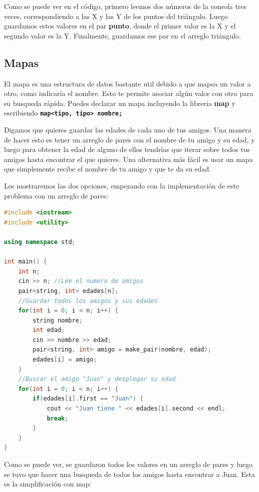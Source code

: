 \documentclass{article}
\begin{document}
Como se puede ver en el código, primero leemos dos números de la consola tres veces, correspondiendo a las X y las Y de los puntos del triángulo. Luego guardamos estos valores en el par \textbf{punto}, donde el primer valor es la X y el segundo valor es la Y. Finalmente, guardamos ese par en el arreglo triángulo.

\subsection{Mapas}

El mapa es una estructura de datos bastante util debido a que mapea un valor a otro, como indicaría el nombre. Esto te permite asociar algún valor con otro para su busqueda rápida. Puedes declarar un mapa incluyendo la libreria \textbf{map} y escribiendo \textbf{\lstinline{map<tipo, tipo> nombre;}}

Digamos que quieres guardar las edades de cada uno de tus amigos. Una manera de hacer esto es tener un arreglo de pares con el nombre de tu amigo y su edad, y luego para obtener la edad de alguno de ellos tendrías que iterar sobre todos tus amigos hasta encontrar el que quieres. Una alternativa más fácil es usar un mapa que simplemente recibe el nombre de tu amigo y que te da su edad.

Les mostraremos las dos opciones, empezando con la implementación de este problema con un arreglo de pares:

\begin{lstlisting}[language=C++, caption=Implementación con pares]
#include <iostream>
#include <utility>

using namespace std;

int main() {
    int n;
    cin >> n; //Lee el numero de amigos
    pair<string, int> edades[n];
    //Guardar todos los amigos y sus edades
    for(int i = 0; i < n; i++) {
        string nombre;
        int edad;
        cin >> nombre >> edad;
        pair<string, int> amigo = make_pair(nombre, edad);
        edades[i] = amigo;
    }
    //Buscar el amigo "Juan" y desplegar su edad
    for(int i = 0; i < n; i++) {
        if(edades[i].first == "Juan") {
            cout << "Juan tiene " << edades[i].second << endl;
            break;
        }
    }
}
\end{lstlisting}

Como se puede ver, se guardaron todos los valores en un arreglo de pares y luego se tuvo que hacer una busqueda de todos los amigos hasta encontrar a Juan. Esta es la simplificación con map:
\end{document}
